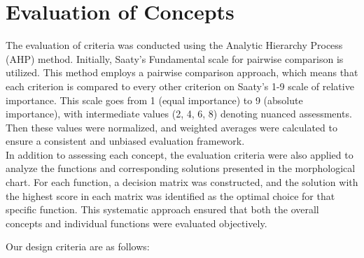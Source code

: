 \documentclass[12pt]{report}
\begin{document}
\section{Evaluation of Concepts}

The evaluation of criteria was conducted using the Analytic Hierarchy Process (AHP) method. Initially, Saaty's Fundamental scale for pairwise comparison is utilized. This method employs a pairwise comparison approach, which means that each criterion is compared to every other criterion on Saaty's 1-9 scale of relative importance. This scale goes from 1 (equal importance) to 9 (absolute importance), with intermediate values (2, 4, 6, 8) denoting nuanced assessments. Then these values were normalized, and weighted averages were calculated to ensure a consistent and unbiased evaluation framework. \\

In addition to assessing each concept, the evaluation criteria were also applied to analyze the functions and corresponding solutions presented in the morphological chart. For each function, a decision matrix was constructed, and the solution with the highest score in each matrix was identified as the optimal choice for that specific function. This systematic approach ensured that both the overall concepts and individual functions were evaluated objectively.


Our design criteria are as follows:
\end{document}

